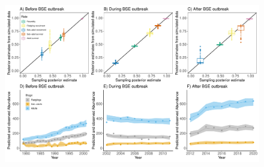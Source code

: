 \documentclass[12pt]{article}
\begin{document}
\newpage
\begin{figure}[h!]
	\caption{}
	\label{Fig4}
	\begin{center}
		\includegraphics[width=16cm]{figs/Fig4.pdf}
	\end{center}
\end{figure}

%
\end{document}
